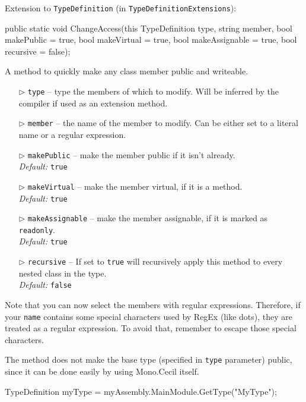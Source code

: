 \documentclass[a4paper,11pt]{article}
\begin{document}
\begin{mdef}
Extension to \texttt{TypeDefinition} (in \texttt{TypeDefinitionExtensions}):
\begin{cs}
public static void ChangeAccess(this TypeDefinition type,
                                string member,
                                bool makePublic = true,
                                bool makeVirtual = true,
                                bool makeAssignable = true,
                                bool recursive = false);
\end{cs}
A method to quickly make any class member public and writeable.
\begin{itemize}
\item[$\triangleright$] \texttt{type} -- type the members of which to modify. Will be inferred by the compiler if used as an extension method.
\item[$\triangleright$] \texttt{member} -- the name of the member to modify. Can be either set to a literal name or a regular expression.
\item[$\triangleright$] \texttt{makePublic} -- make the member public if it isn't already.
\\ \textit{Default:} \texttt{true}
\item[$\triangleright$] \texttt{makeVirtual} -- make the member virtual, if it is a method.
\\ \textit{Default:} \texttt{true}
\item[$\triangleright$] \texttt{makeAssignable} -- make the member assignable, if it is marked as \texttt{readonly}.
\\ \textit{Default:} \texttt{true}
\item[$\triangleright$] \texttt{recursive} -- If set to \texttt{true} will recursively apply this method to every nested class in the type.
\\ \textit{Default:} \texttt{false}
\end{itemize}
Note that you can now select the members with regular expressions. Therefore, if your \texttt{name} contains some special characters used by RegEx (like dots), they are treated as a regular expression. To avoid that, remember to escape those special characters.
\newline

The method does not make the base type (specified in \texttt{type} parameter) public, since it can be done easily by using Mono.Cecil itself.
\begin{cs}
TypeDefinition myType = myAssembly.MainModule.GetType("MyType");


\end{cs}
\end{mdef}
\end{document}
